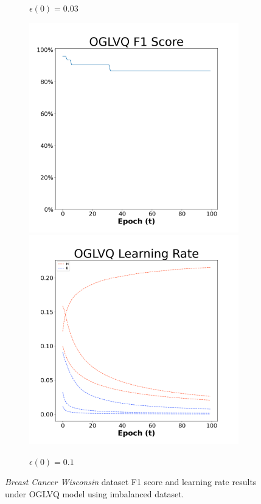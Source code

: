 \begin{figure}[H]
\begin{subfigure}{0.3\textwidth}
  \caption{$\epsilon(0)=0.03$}
\end{subfigure}\hfil %
\begin{subfigure}{0.3\textwidth}
  \includegraphics[width=\linewidth]{images/exper2/breast/OGLVQ_0.1_f1.png}
  \includegraphics[width=\linewidth]{images/exper2/breast/OGLVQ_0.1_lr.png}
  \caption{$\epsilon(0)=0.1$}
\end{subfigure}

\caption{\textit{Breast Cancer Wisconsin} dataset F1 score and learning rate results under OGLVQ model using imbalanced dataset.}
\end{figure}




